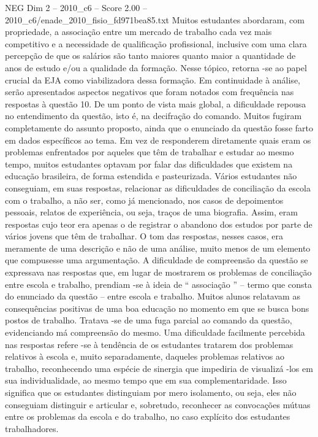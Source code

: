 \begin{textsample}{NEG Dim 2 – 2010\_c6 – Score 2.00 – 2010\_c6/enade\_2010\_fisio\_fd971bea85.txt}
Muitos estudantes abordaram, com propriedade, a associação entre um mercado de trabalho cada vez mais competitivo e a necessidade de qualificação profissional, inclusive com uma clara percepção de que os salários são tanto maiores quanto maior a quantidade de anos de estudo e/ou a qualidade da formação.
Nesse tópico, retorna -se ao papel crucial da EJA como viabilizadora dessa formação.
Em continuidade à análise, serão apresentados aspectos negativos que foram notados com frequência nas respostas à questão 10.
De um ponto de vista mais global, a dificuldade repousa no entendimento da questão, isto é, na decifração do comando.
Muitos fugiram completamente do assunto proposto, ainda que o enunciado da questão fosse farto em dados específicos ao tema.
Em vez de responderem diretamente quais eram os problemas enfrentados por aqueles que têm de trabalhar e estudar ao mesmo tempo, muitos estudantes optavam por falar das dificuldades que existem na educação brasileira, de forma estendida e pasteurizada.
Vários estudantes não conseguiam, em suas respostas, relacionar as dificuldades de conciliação da escola com o trabalho, a não ser, como já mencionado, nos casos de depoimentos pessoais, relatos de experiência, ou seja, traços de uma biografia.
Assim, eram respostas cujo teor era apenas o de registrar o abandono dos estudos por parte de vários jovens que têm de trabalhar.
O tom das respostas, nesses casos, era meramente de uma descrição e não de uma análise, muito menos de um elemento que compusesse uma argumentação.
A dificuldade de compreensão da questão se expressava nas respostas que, em lugar de mostrarem os problemas de conciliação entre escola e trabalho, prendiam -se à ideia de “ associação ” – termo que consta do enunciado da questão – entre escola e trabalho.
Muitos alunos relatavam as consequências positivas de uma boa educação no momento em que se busca bons postos de trabalho.
Tratava -se de uma fuga parcial ao comando da questão, evidenciando má compreensão do mesmo.
Uma dificuldade facilmente percebida nas respostas refere -se à tendência de os estudantes tratarem dos problemas relativos à escola e, muito separadamente, daqueles problemas relativos ao trabalho, reconhecendo uma espécie de sinergia que impediria de visualizá -los em sua individualidade, ao mesmo tempo que em sua complementaridade.
Isso significa que os estudantes distinguiam por mero isolamento, ou seja, eles não conseguiam distinguir e articular e, sobretudo, reconhecer as convocações mútuas entre os problemas da escola e do trabalho, no caso explícito dos estudantes trabalhadores.

\end{textsample}
